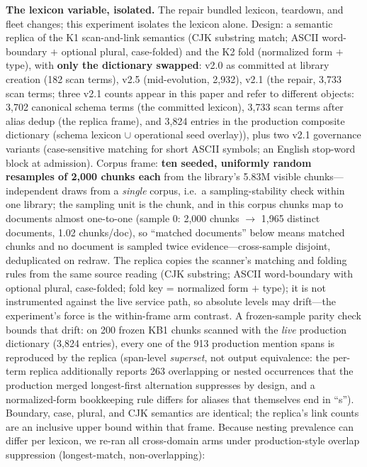\documentclass[preprint,12pt]{elsarticle}
\begin{document}
\textbf{The lexicon variable, isolated.} The repair bundled lexicon,
teardown, and fleet changes; this experiment isolates the lexicon
alone. Design: a semantic replica of the K1 scan-and-link semantics
(CJK substring match; ASCII word-boundary $+$ optional plural,
case-folded) and the K2 fold (normalized form $+$ type), with
\textbf{only the dictionary swapped}: v2.0 as committed at library
creation (182 scan terms), v2.5 (mid-evolution, 2{,}932), v2.1 (the
repair, 3{,}733 scan terms; three v2.1 counts appear in this paper
and refer to different objects: 3{,}702 canonical schema terms (the
committed lexicon), 3{,}733 scan terms after alias dedup (the replica
frame), and 3{,}824 entries in the production composite dictionary
(schema lexicon $\cup$ operational seed overlay)), plus two v2.1
governance variants (case-sensitive
matching for short ASCII symbols; an English stop-word block at
admission). Corpus frame: \textbf{ten seeded, uniformly
random resamples of 2{,}000 chunks each} from the library's 5.83M
visible chunks---independent draws from a \emph{single} corpus, i.e.\ a
sampling-stability check within one library; the sampling unit is
the chunk, and in this corpus chunks map to documents almost
one-to-one (sample 0: 2{,}000 chunks $\to$ 1{,}965 distinct
documents, 1.02 chunks/doc), so ``matched documents'' below means
matched chunks and no document is sampled twice
evidence---cross-sample disjoint, deduplicated on redraw. The replica
copies the scanner's matching and folding rules from the same source
reading (CJK substring; ASCII word-boundary with optional plural,
case-folded; fold key = normalized form $+$ type); it is not
instrumented against the live service path, so absolute levels may
drift---the experiment's force is the within-frame arm contrast. A
frozen-sample parity check bounds that drift: on 200 frozen KB1 chunks
scanned with the \emph{live} production dictionary (3{,}824 entries),
every one of the 913 production mention spans is reproduced by the
replica (span-level \emph{superset}, not output equivalence: the
per-term replica additionally reports 263 overlapping or nested
occurrences that the production merged longest-first alternation
suppresses by design, and a normalized-form bookkeeping rule differs
for aliases that themselves end in ``s''). Boundary, case, plural, and
CJK semantics are identical; the replica's link counts are an
inclusive upper bound within that frame. Because nesting prevalence
can differ per lexicon, we re-ran all cross-domain arms under
production-style overlap suppression (longest-match, non-overlapping):
\end{document}
